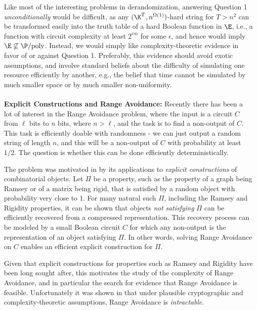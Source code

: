 \documentclass[11pt]{article}
\renewcommand{\poly}{\mathrm{poly}}
\begin{document}
Like most of the interesting problems in derandomization, answering Question 1 {\it unconditionally} would be difficult, as any $(\K^T, n^{\Omega(1)})$-hard string for $T > n^2$ can be transformed easily into the truth table of a hard Boolean function in $\E$, i.e., a function with circuit complexity at least $2^{\epsilon m}$ for some $\epsilon$, and hence would imply $\E \not\subseteq \P/\poly$. 
Instead, we would simply like complexity-theoretic evidence in favor of or against Question 1. Preferably, this evidence should avoid exotic assumptions, and involve standard beliefs about the difficulty of simulating one resource efficiently by another, e.g., the belief that time cannot be simulated by much smaller space or by much smaller non-uniformity. \\
\\
{\bf \noindent Explicit Constructions and Range Avoidance:} Recently there has been a lot of interest \cite{Korten21, KKMP21, RSW22, GLW22, ILW23, GGNS23, CGLOSS23, CHLR23, CL24, CHR24, Li24, KP24} in the Range Avoidance problem, where the input is a circuit $C$ from $\ell$ bits to $n$ bits, where $n > \ell$, and the task is to find a non-output of $C$. This task is efficiently doable with randomness - we can just output a random string of length $n$, and this will be a non-output of $C$ with probability at least $1/2$. The question is whether this can be done efficiently deterministically.

The problem was motivated in \cite{Korten21, KKMP21} by its applications to {\it explicit constructions} of combinatorial objects. Let $\Pi$ be a property, such as the property of a graph being Ramsey or of a matrix being rigid, that is satisfied by a random object with probability very close to $1$. For many natural such $\Pi$, including the Ramsey and Rigidity properties, it can be shown that objects {\it not satisfying} $\Pi$ can be efficiently recovered from a compressed representation. This recovery process can be modeled by a small Boolean circuit $C$ for which any non-output is the representation of an object satisfying $\Pi$. In other words, solving Range Avoidance on $C$
enables an efficient explicit construction for $\Pi$.

Given that explicit constructions for properties such as Ramsey and Rigidity have been long sought after, this motivates the study of the complexity of Range Avoidance, and in particular the search for evidence that Range Avoidance is feasible. Unfortunately it was shown in \cite{ILW23} that under plausible cryptographic and complexity-theoretic assumptions, Range Avoidance is {\it intractable}.
\end{document}

